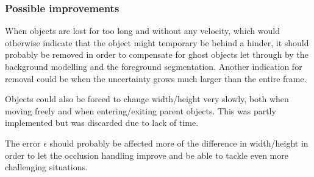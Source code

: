 \subsubsection{Possible improvements}
When objects are lost for too long and without any velocity, which would otherwise indicate that the object might temporary be behind a hinder, it should probably be removed in order to compensate for ghost objects let through by the background modelling and the foreground segmentation. Another indication for removal could be when the uncertainty grows much larger than the entire frame.

Objects could also be forced to change width/height very slowly, both when moving freely and when entering/exiting parent objects. This was partly implemented but was discarded due to lack of time.

The error $\epsilon$ should probably be affected more of the difference in width/height in order to let the occlusion handling improve and be able to tackle even more challenging situations.















